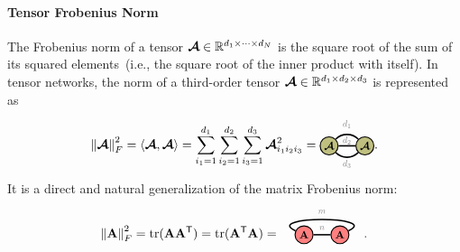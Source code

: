 \paragraph{Tensor Frobenius Norm} The Frobenius norm of a tensor $\bm{\mathcal{A}}\in\mathbb{R}^{d_1\times\cdots\times d_N}$ is the square root of the sum of its
squared elements~(i.e., the square root of the inner product with itself). In tensor networks, the norm of a third-order tensor $\bm{\mathcal{A}}\in\mathbb{R}^{d_1\times d_2\times d_3}$ is represented as
\begin{align*}
\norm{\At}_F^2 = \langle\At,\At\rangle = 
\sum_{i_1=1}^{d_1}\sum_{i_2=1}^{d_2}\sum_{i_3=1}^{d_3}\At_{i_1i_2i_3}^2
=
\begin{tikzpicture}[baseline=\baseline]
    \tikzset{tensor/.style = {minimum size = 0.5cm,shape = circle,thick,draw=black,inner sep = 0pt}, edge/.style = {thick,line width=.4mm},every loop/.style={}}
    \def\y{0}
    \def\x{0}
    \node[tensor,fill=green!50!red!50!white] (At) at (\x,\y){\scalebox{0.85}{$\At$}};
    \node[tensor,fill=green!50!red!50!white] (At1) at (\x+1,\y){\scalebox{0.85}{$\At$}};
    \draw[edge] (At) -- (At1);
    \draw[edge] (At) to [out=45,in=135] (At1);
    \draw[edge] (At) to [out=-45,in=-135] (At1);
    \node[draw=none] () at (\x+0.5,\y+0.6) {\scalebox{0.7}{\dimcolor{$d_1$}}};
    \node[draw=none] () at (\x+0.5,\y+0.15) {\scalebox{0.7}{\dimcolor{$d_2$}}};
    \node[draw=none] () at (\x+0.5,\y-0.5) {\scalebox{0.7}{\dimcolor{$d_3$}}};
\end{tikzpicture} .
\end{align*}
It is a direct and natural generalization of the matrix Frobenius norm: 
\begin{align*}
 \norm{\Ab}_F^2 = \tr(\Ab\Ab^\ts) = \tr(\Ab^\ts\Ab) =  \hspace*{-0.5cm}
\begin{tikzpicture}[baseline=\baseline]
   \tikzset{tensor/.style = {minimum size = 0.5cm,shape = circle,thick,draw=black,inner sep = 0pt}, edge/.style = {thick,line width=.4mm},every loop/.style={}}
    \def\y{0}
    \def\x{0}
    \node[tensor,fill=red!50!white] (A) at (\x,\y){\scalebox{0.85}{$\Ab$}};
    \node[tensor,fill=red!50!white] (B) at (\x+1,\y){\scalebox{0.85}{$\Ab$}};
    \draw[edge] (A) -- (B) node [midway,above]{\scalebox{0.7}{\dimcolor{$n$}}};
    \draw[edge] (A) to [out=155,in=25, distance=1cm] (B);
    \node[draw=none] () at (\x+0.5,\y+0.65) {\scalebox{0.7}{\dimcolor{$m$}}};
    \end{tikzpicture} \hspace*{-0.5cm}.
\end{align*}


